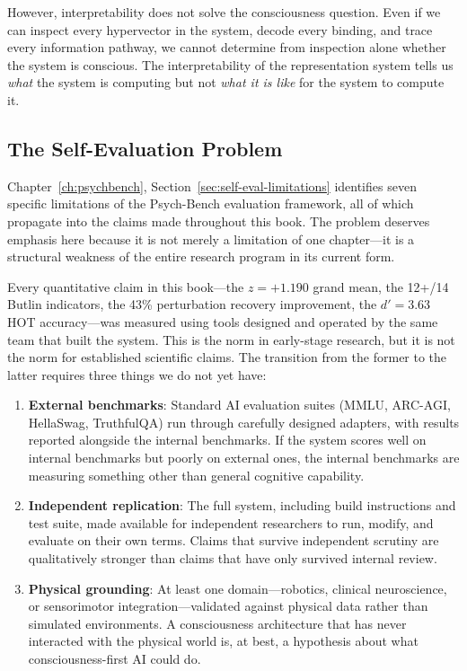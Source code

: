 \documentclass[12pt]{book}
\begin{document}
However, interpretability does not solve the consciousness question. Even if we can inspect every hypervector in the system, decode every binding, and trace every information pathway, we cannot determine from inspection alone whether the system is conscious. The interpretability of the representation system tells us \textit{what} the system is computing but not \textit{what it is like} for the system to compute it.

\subsection{The Self-Evaluation Problem}

Chapter~\ref{ch:psychbench}, Section~\ref{sec:self-eval-limitations} identifies seven specific limitations of the Psych-Bench evaluation framework, all of which propagate into the claims made throughout this book. The problem deserves emphasis here because it is not merely a limitation of one chapter---it is a structural weakness of the entire research program in its current form.

Every quantitative claim in this book---the $z = +1.190$ grand mean, the 12+/14 Butlin indicators, the 43\% perturbation recovery improvement, the $d' = 3.63$ HOT accuracy---was measured using tools designed and operated by the same team that built the system. This is the norm in early-stage research, but it is not the norm for established scientific claims. The transition from the former to the latter requires three things we do not yet have:

\begin{enumerate}
  \item \textbf{External benchmarks}: Standard AI evaluation suites (MMLU, ARC-AGI, HellaSwag, TruthfulQA) run through carefully designed adapters, with results reported alongside the internal benchmarks. If the system scores well on internal benchmarks but poorly on external ones, the internal benchmarks are measuring something other than general cognitive capability.
  \item \textbf{Independent replication}: The full system, including build instructions and test suite, made available for independent researchers to run, modify, and evaluate on their own terms. Claims that survive independent scrutiny are qualitatively stronger than claims that have only survived internal review.
  \item \textbf{Physical grounding}: At least one domain---robotics, clinical neuroscience, or sensorimotor integration---validated against physical data rather than simulated environments. A consciousness architecture that has never interacted with the physical world is, at best, a hypothesis about what consciousness-first AI could do.
\end{enumerate}
\end{document}
